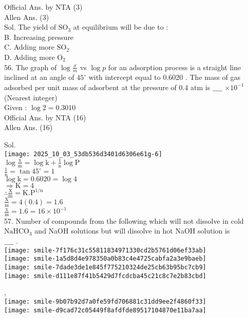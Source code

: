 \documentclass[10pt]{article}
\begin{document}
Official Ans. by NTA (3)\\
Allen Ans. (3)\\
Sol. The yield of \(\mathrm{SO}_{3}\) at equilibrium will be due to :\\
B. Increasing pressure\\
C. Adding more \(\mathrm{SO}_{2}\)\\
D. Adding more \(\mathrm{O}_{2}\)\\
56. The graph of \(\log \frac{x}{m}\) vs \(\log p\) for an adsorption process is a straight line inclined at an angle of \(45^{\circ}\) with intercept equal to 0.6020 . The mass of gas adsorbed per unit mass of adsorbent at the pressure of 0.4 atm is \(\_\_\_\_\) \(\times 10^{-1}\) (Nearest integer)\\
Given : \(\log 2=0.3010\)\\
Official Ans. by NTA (16)\\
Allen Ans. (16)

Sol.\\
\texttt{[image: 2025\_10\_03\_53db536d3401d6306e61g-6]}\\
\(\log \frac{\mathrm{x}}{\mathrm{m}}=\log \mathrm{k}+\frac{1}{\mathrm{n}} \log \mathrm{P}\)\\
\(\frac{1}{\mathrm{n}}=\tan 45^{\circ}=1\)\\
\(\log \mathrm{k}=0.6020=\log 4\)\\
\(\Rightarrow \mathrm{K}=4\)\\
\(\therefore \frac{\mathrm{X}}{\mathrm{m}}=\mathrm{K} . \mathrm{P}^{1 / \mathrm{n}}\)\\
\(\frac{\mathrm{X}}{\mathrm{m}}=4(0.4)=1.6\)\\
\(\frac{\mathrm{x}}{\mathrm{m}}=1.6=16 \times 10^{-1}\)\\
57. Number of compounds from the following which will not dissolve in cold \(\mathrm{NaHCO}_{3}\) and NaOH solutions but will dissolve in hot NaOH solution is\\
\(\_\_\_\_\) .\\
\texttt{[image: smile-7f176c31c55811834971330cd2b5761d06ef33ab]}\\
\texttt{[image: smile-1a5d8d4e978350a0b83c4e4725cabfa2a3e9baeb]}\\
\texttt{[image: smile-7dade3de1e845f775210324de25cb63b95bc7cb9]}\\
\texttt{[image: smile-d111e87f41b5429d7fcdcba45c21c8c7e2b83cbd]}

,\\
\texttt{[image: smile-9b07b92d7a0fe59fd706881c31dd9ee2f4860f33]}\\
\texttt{[image: smile-d9cad72c05449f8afdfde89517104870e11ba7aa]}
\end{document}

